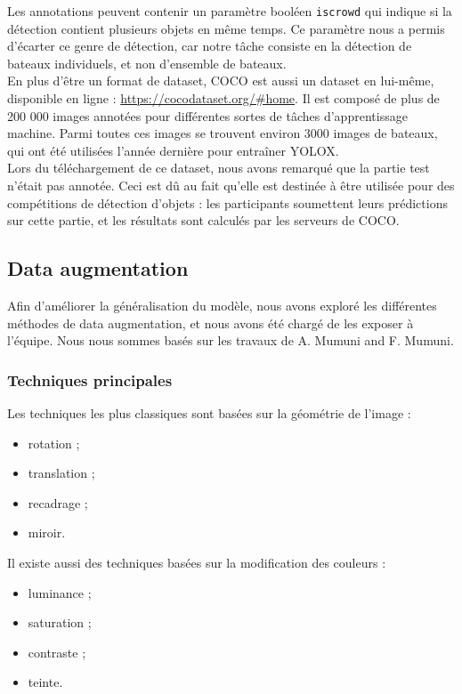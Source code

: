 Les annotations peuvent contenir un paramètre booléen \texttt{iscrowd} qui indique si
la détection contient plusieurs objets en même temps. Ce paramètre nous a permis d'écarter
ce genre de détection, car notre tâche consiste en la détection de bateaux individuels,
et non d'ensemble de bateaux. \\

En plus d'être un format de dataset, COCO est aussi un dataset en lui-même, disponible
en ligne : \url{https://cocodataset.org/#home}.
Il est composé de plus de 200 000 images annotées pour différentes sortes de tâches d'apprentissage machine.
Parmi toutes ces images se trouvent environ 3000 images de bateaux, qui ont été utilisées
l'année dernière pour entraîner YOLOX. \\

Lors du téléchargement de ce dataset, nous avons remarqué que la partie test n'était pas annotée.
Ceci est dû au fait qu'elle est destinée à être utilisée pour des compétitions de détection d'objets :
les participants soumettent leurs prédictions sur cette partie, et les résultats sont calculés par les
serveurs de COCO.\\

\subsection{Data augmentation}

Afin d'améliorer la généralisation du modèle, nous avons exploré les différentes méthodes de data augmentation,
et nous avons été chargé de les exposer à l'équipe. Nous nous sommes basés
sur les travaux de A. Mumuni and F. Mumuni\cite{Mumuni_Mumuni_2022}.

\subsubsection{Techniques principales}

Les techniques les plus classiques sont basées sur la géométrie de l'image :
\begin{itemize}
    \item rotation ;
    \item translation ;
    \item recadrage ;
    \item miroir.
\end{itemize}

Il existe aussi des techniques basées sur la modification des couleurs :
\begin{itemize}
    \item luminance ;
    \item saturation ;
    \item contraste ;
    \item teinte.
\end{itemize}

